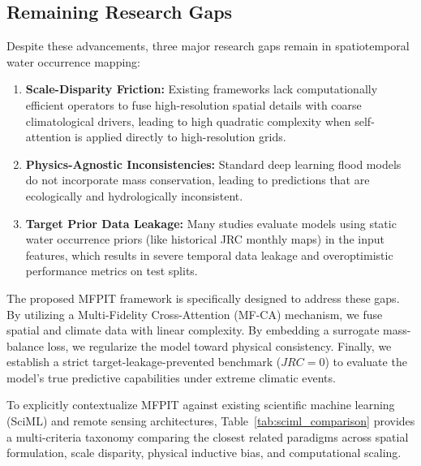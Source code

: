 \documentclass[preprint,12pt]{elsarticle}
\begin{document}
\subsection{Remaining Research Gaps}
Despite these advancements, three major research gaps remain in spatiotemporal water occurrence mapping:
\begin{enumerate}
    \item \textbf{Scale-Disparity Friction:} Existing frameworks lack computationally efficient operators to fuse high-resolution spatial details with coarse climatological drivers, leading to high quadratic complexity when self-attention is applied directly to high-resolution grids.
    \item \textbf{Physics-Agnostic Inconsistencies:} Standard deep learning flood models do not incorporate mass conservation, leading to predictions that are ecologically and hydrologically inconsistent.
    \item \textbf{Target Prior Data Leakage:} Many studies evaluate models using static water occurrence priors (like historical JRC monthly maps) in the input features, which results in severe temporal data leakage and overoptimistic performance metrics on test splits.
\end{enumerate}
The proposed MFPIT framework is specifically designed to address these gaps. By utilizing a Multi-Fidelity Cross-Attention (MF-CA) mechanism, we fuse spatial and climate data with linear complexity. By embedding a surrogate mass-balance loss, we regularize the model toward physical consistency. Finally, we establish a strict target-leakage-prevented benchmark ($JRC=0$) to evaluate the model's true predictive capabilities under extreme climatic events.

To explicitly contextualize MFPIT against existing scientific machine learning (SciML) and remote sensing architectures, Table~\ref{tab:sciml_comparison} provides a multi-criteria taxonomy comparing the closest related paradigms across spatial formulation, scale disparity, physical inductive bias, and computational scaling.
\end{document}
